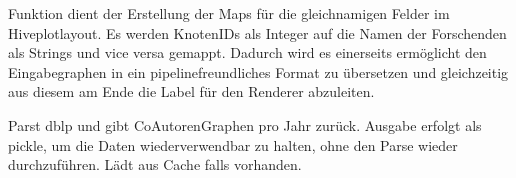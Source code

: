 \documentclass[a4paper,10pt,ngerman]{sphinxmanual}
\begin{document}
\begin{fulllineitems}
\label{\detokenize{api:src.dblp_parser.build_node_identity_maps}}
\pysigstartsignatures
\pysiglinewithargsret
{}
{}
{}
\pysigstopsignatures
\sphinxAtStartPar
Funktion dient der Erstellung der Maps für die gleichnamigen Felder im Hiveplotlayout. Es werden KnotenIDs als Integer auf die Namen der Forschenden als Strings und vice versa gemappt. Dadurch wird es einerseits ermöglicht den Eingabegraphen in ein pipelinefreundliches Format zu übersetzen und
gleichzeitig aus diesem am Ende die Label für den Renderer abzuleiten.
\begin{quote}\begin{description}
\sphinxAtStartPar
{}

\end{description}\end{quote}

\end{fulllineitems}


\begin{fulllineitems}
\label{\detokenize{api:src.dblp_parser.parse_gd_coauthor_networks}}
\pysigstartsignatures
\pysiglinewithargsret
{}
{\sphinxparamcomma {}}
{}
\pysigstopsignatures
\sphinxAtStartPar
Parst dblp und gibt Co\sphinxhyphen{}Autoren\sphinxhyphen{}Graphen pro Jahr zurück. Ausgabe erfolgt als pickle, um die Daten wiederverwendbar zu halten, ohne den Parse wieder durchzuführen. Lädt aus Cache falls vorhanden.
\begin{quote}\begin{description}
\sphinxAtStartPar
{}

\end{description}\end{quote}

\end{fulllineitems}
\end{document}
